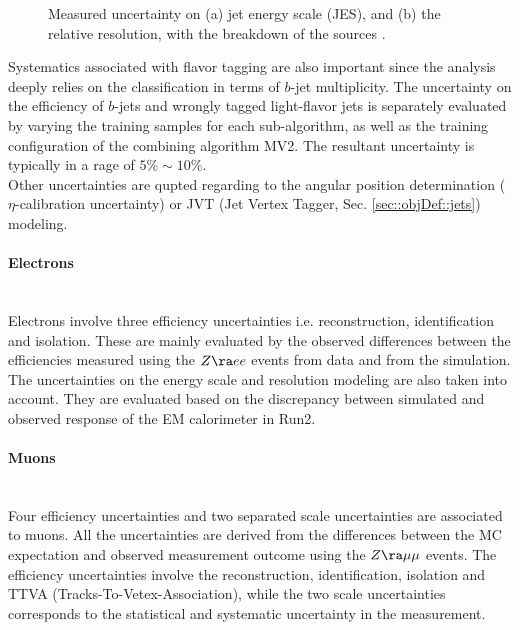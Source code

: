 \begin{figure}
  \centering
    \caption{ Measured uncertainty on (a) jet energy scale (JES), and (b) the relative resolution, with the breakdown of the sources \cite{144_JESmeas_2015data}.
      \label{fig::objDef::JERUnct2015_pt_144} }
\end{figure}

Systematics associated with flavor tagging are also important since the analysis deeply relies on the classification in terms of $b$-jet multiplicity. 
The uncertainty on the efficiency of $b$-jets and wrongly tagged light-flavor jets is separately evaluated by varying the training samples for each sub-algorithm, as well as the training configuration of the combining algorithm MV2. The resultant uncertainty is typically in a rage of $5\% \sim 10\%$. \\

Other uncertainties are qupted regarding to the angular position determination ($\eta$-calibration uncertainty) or JVT (Jet Vertex Tagger, Sec. \ref{sec::objDef::jets}) modeling. \\


\paragraph{Electrons} \mbox{} \\
Electrons involve three efficiency uncertainties i.e. reconstruction, identification and isolation.
These are mainly evaluated by the observed differences between the efficiencies measured using the $Z\ra ee$ events from data and from the simulation.
The uncertainties on the energy scale and resolution modeling are also taken into account.
They are evaluated based on the discrepancy between simulated and observed response of the EM calorimeter in Run2.  \\



\paragraph{Muons} \mbox{} \\
Four efficiency uncertainties and two separated scale uncertainties are associated to muons.
All the uncertainties are derived from the differences between the MC expectation and observed measurement outcome using the $Z\ra\mu\mu$ events. 
The efficiency uncertainties involve the reconstruction, identification, isolation and TTVA (Tracks-To-Vetex-Association), 
while the two scale uncertainties corresponds to the statistical and systematic uncertainty in the measurement. \\

